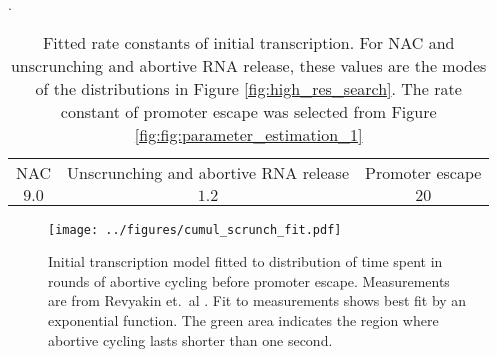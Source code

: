 
\begin{table}
  \label{tab:param_fit_revyakin}
  \caption{Fitted rate constants of initial transcription. For NAC and
  unscrunching and abortive RNA release, these values are the modes of the
  distributions in Figure \ref{fig:high_res_search}. The rate constant of
  promoter escape was selected from Figure \ref{fig:fig:parameter_estimation_1}}.
  \begin{center}
    \begin{tabular}{ccc}
       \toprule
       NAC & Unscrunching and abortive RNA release & Promoter escape \\
       $9.0$ & $1.2$ & $20$ \\
    \end{tabular}
  \end{center}
\end{table}

\begin{figure}
    \begin{center}
      \texttt{[image: ../figures/cumul\_scrunch\_fit.pdf]}
    \end{center}
    \caption{Initial transcription model fitted to distribution of time spent
      in rounds of abortive cycling before promoter escape. Measurements are
      from Revyakin et.\ al \cite{revyakin_abortive_2006}. Fit to measurements
      shows best fit by an exponential function. The green area indicates the
      region where abortive cycling lasts shorter than one second.}
\label{fig:revyakin_fit}
\end{figure}


